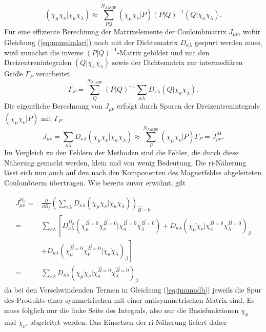 	\begin{equation}\label{eq:munukalari}
	\left(\chi_\mu\chi_\nu\vert\chi_\kappa\chi_\lambda\right)\approx\sum_{PQ}^{N_{\textrm{AuxBF}}}\left(\chi_\mu\chi_\nu\vert P\right)\left(P\vert Q\right)^{-1}\left(Q\vert\chi_\kappa\chi_\lambda\right).		
	\end{equation}
	Für eine effiziente Berechnung der Matrixelemente der Coulombmatrix $J_{\mu\nu}$, wofür Gleichung (\ref{eq:munukalari}) noch mit der Dichtematrix $D_{\kappa\lambda}$ gespurt werden muss, wird zunächst die inverse $\left(P\vert Q\right)^{-1}$-Matrix gebildet und mit den Dreizentrenintegralen $\left(Q\vert\chi_\kappa\chi_\lambda\right)$ sowie der Dichtematrix zur intermediären Größe $\Gamma_P$ verarbeitet
	\begin{equation}
	\Gamma_P=\sum_Q^{N_{\textrm{AuxBF}}}\left(P\vert Q\right)^{-1}\sum_{\kappa\lambda}D_{\kappa\lambda}\left(Q\vert\chi_\kappa\chi_\lambda\right).
	\end{equation}
	Die eigentliche Berechnung von $J_{\mu\nu}$ erfolgt durch Spuren der Dreizentrenintegrale $\left(\chi_\mu\chi_\nu\vert P\right)$ mit $\Gamma_P$
	\begin{equation}
	J_{\mu\nu}=\sum_{\kappa\lambda}D_{\kappa\lambda}\left(\chi_\mu\chi_\nu\vert\chi_\kappa\chi_\lambda\right)\approx\sum_{P}^{N_{\textrm{AuxBF}}}\left(\chi_\mu\chi_\nu\vert P\right)\Gamma_P=J_{\mu\nu}^{\textrm{RI}}.
	\end{equation}
	Im Vergleich zu den Fehlern der Methoden sind die Fehler, die durch diese Näherung gemacht werden, klein und von wenig Bedeutung.\supercite{eichkorn1995auxiliary} Die \ac{ri}-Näherung lässt sich nun auch auf den nach den Komponenten des Magnetfeldes abgeleiteten Coulombterm übertragen. Wie bereits zuvor erwähnt, gilt
	
	\begin{equation}\label{eq:jmunudb}
	\begin{aligned}
	J_{\mu\nu}^{B_\beta}=&\frac{\partial}{\partial B_\beta}\left(\sum_{\kappa\lambda}D_{\kappa\lambda}\left(\chi_\mu\chi_\nu\vert\chi_\kappa\chi_\lambda\right)\right)_{\vec{B}=0}\\
	=&\sum_{\kappa\lambda}\left[D_{\kappa\lambda}^{B_\beta}\left(\chi_\mu^{\vec{B}=0}\chi_\nu^{\vec{B}=0}\vert\chi_\kappa^{\vec{B}=0}\chi_\lambda^{\vec{B}=0}\right)+D_{\kappa\lambda}\left(\overline{\chi_\mu\chi_\nu}\vert\chi_\kappa^{\vec{B}=0}\chi_\lambda^{\vec{B}=0}\right)_{\beta}\right.\\
    &+\left.D_{\kappa\lambda}\left(\chi_\mu^{\vec{B}=0}\chi_\nu^{\vec{B}=0}\vert\overline{\chi_\kappa\chi_\lambda}\right)_{\beta}\right]\\
    =&\sum_{\kappa\lambda}D_{\kappa\lambda}\left(\overline{\chi_\mu\chi_\nu}\vert\chi_\kappa^{\vec{B}=0}\chi_\lambda^{\vec{B}=0}\right)_{\beta}
	\end{aligned}
	\end{equation}
	da bei den Verschwindenden Termen in Gleichung (\ref{eq:jmunudb}) jeweils die Spur des Produkts einer symmetrischen mit einer antisymmetrischen Matrix sind. Es muss folglich nur die linke Seite des Integrals, also nur die Basisfunktionen $\chi_\mu$ und $\chi_\nu$, abgeleitet werden. Das Einsetzen der \ac{ri}-Näherung liefert daher
	

